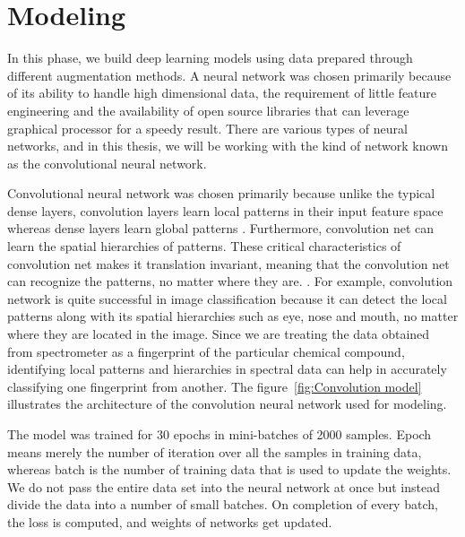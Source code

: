 \section{Modeling}
In this phase, we build deep learning models using data prepared through different augmentation methods. A neural network was chosen primarily because of its ability to handle high dimensional data, the requirement of little feature engineering and the availability of open source libraries that can leverage graphical processor for a speedy result. There are various types of neural networks, and in this thesis, we will be working with the kind of network known as the convolutional neural network.

Convolutional neural network was chosen primarily because unlike the typical dense layers, convolution layers learn local patterns in their input feature space whereas dense layers learn global patterns \citep{chollet2017deep}. Furthermore, convolution net can learn the spatial hierarchies of patterns. These critical characteristics of convolution net makes it translation invariant, meaning that the convolution net can recognize the patterns, no matter where they are. \citep{chollet2017deep}. For example, convolution network is quite successful in image classification because it can detect the local patterns along with its spatial hierarchies such as eye, nose and mouth, no matter where they are located in the image. Since we are treating the data obtained from spectrometer as a fingerprint of the particular chemical compound, identifying local patterns and hierarchies in spectral data can help in accurately classifying one fingerprint from another. The figure~\ref{fig:Convolution model} illustrates the architecture of the convolution neural network used for modeling. 

The model was trained for 30 epochs in mini-batches of 2000 samples. Epoch means merely the number of iteration over all the samples in training data, whereas batch is the number of training data that is used to update the weights. We do not pass the entire data set into the neural network at once but instead divide the data into a number of small batches. On completion of every batch, the loss is computed, and weights of networks get updated.


